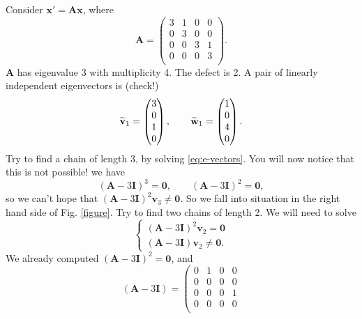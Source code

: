 \documentclass[12pt]{article}
\newcommand{\bx}{\mathbf{x}}
\newcommand{\bv}{\mathbf{v}}
\newcommand{\bw}{\mathbf{w}}
\newcommand{\bA}{\mathbf{A}}
\newcommand{\bI}{\mathbf{I}}
\begin{document}
\begin{example}\label{example}
		Consider $\bx'=\bA\bx$, where 
	\begin{equation}
		\bA=\left(
\begin{array}{cccc}
 3 & 1 & 0 & 0 \\
 0 & 3 & 0 & 0 \\
 0 & 0 & 3 & 1 \\
 0 & 0 & 0 & 3 \\
\end{array}
\right).
	\end{equation}
$\bA$ has eigenvalue $3$ with multiplicity 4.
The defect is 2.
A pair of linearly independent eigenvectors is (check!)
\begin{equation}
	\td{\bv}_1=\begin{pmatrix}
		3\\
		0\\
		1\\
		0
	\end{pmatrix},\qquad \td{\bw}_1=\begin{pmatrix}
		1\\
		0\\
		4\\
		0
	\end{pmatrix}.
\end{equation}
Try to find a chain of length 3, by solving \eqref{eq:e-vectors}.
You will now notice that this is not possible! we have 
\begin{equation}
	(\bA-3 \bI)^{3}= \mathbf{0},
	\qquad (\bA-3 \bI)^{2}=\mathbf{0},
\end{equation}
so we can't hope that $(\bA-3 \bI)^{2}\bv_3\neq \mathbf{0}. $
So we fall into situation in the right hand side of Fig. \ref{figure}.
Try to find two chains of length 2. We will need to solve
\begin{equation}\label{eq:e-vectors_rank_2}
		\begin{cases}
			(\bA-3 \bI)^{2}\bv_{2}=\mathbf{0}\\
			(\bA-3 \bI)\bv_{2}\neq \mathbf{0}.
		\end{cases}
	\end{equation}
	We already computed $ (\bA-3 \bI)^{2}=\mathbf{0}$, and 
	\begin{equation}
		(\bA-3 \bI)=\left(
\begin{array}{cccc}
 0 & 1 & 0 & 0 \\
 0 & 0 & 0 & 0 \\
 0 & 0 & 0 & 1 \\
 0 & 0 & 0 & 0 \\

\end{array}
\end{equation}
\end{example}
\end{document}
